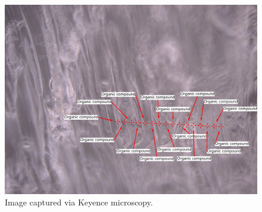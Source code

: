 \documentclass[twocolumn]{article}
\begin{document}
            \begin{figure}
                \centering
                \includegraphics[width=\columnwidth]{img/keyence.png}
                \caption{Image captured via Keyence microscopy.}\label{fig:key}
            \end{figure}
\end{document}

